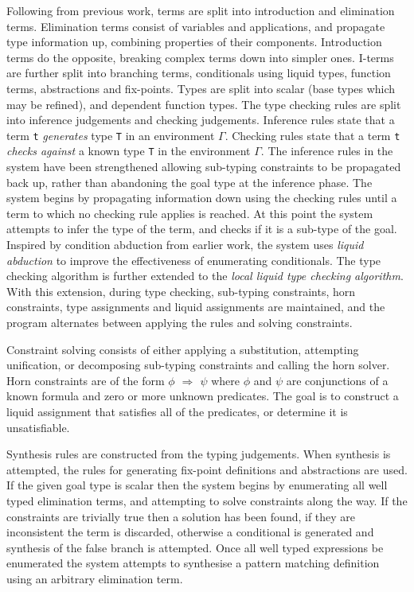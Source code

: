 \documentclass[a4paper]{article}
\begin{document}
Following from previous work, terms are split into introduction and elimination terms. Elimination terms consist of 
variables and applications, and propagate type information up, combining properties of their components. Introduction 
terms do the opposite, breaking complex terms down into simpler ones. I-terms are further split into branching terms, 
conditionals using liquid types, function terms, abstractions and fix-points. Types are split into scalar (base types which may be refined),
and dependent function types. The type checking rules are split into inference judgements and checking judgements. 
Inference rules state that a term \texttt{t} \emph{generates} type \texttt{T} in an environment \(\Gamma\). Checking rules state that a term 
\texttt{t} \emph{checks against} a known type \texttt{T} in the environment \(\Gamma\). The inference rules in the system have been strengthened
allowing sub-typing constraints to be propagated back up, rather than abandoning the goal type at the inference phase.
The system begins by propagating information down using the checking rules until a term to which no checking rule
applies is reached. At this point the system attempts to infer the type of the term, and checks if it is a sub-type of the goal.  
Inspired by condition abduction from earlier work, the system uses \emph{liquid abduction} to improve the effectiveness of 
enumerating conditionals. The type checking algorithm is further extended to the \emph{local liquid type checking algorithm}.
With this extension, during type checking, sub-typing constraints, horn constraints, type assignments and liquid assignments 
are maintained, and the program alternates between applying the rules and solving constraints. 

Constraint solving consists of either applying a substitution, attempting unification, or decomposing sub-typing constraints 
and calling the horn solver. Horn constraints are of the form \emph{\(\phi\) \(\Rightarrow\) \(\psi\)} where \(\phi\) and \(\psi\) are conjunctions of a 
known formula and zero or more unknown predicates. The goal is to construct a liquid assignment that satisfies all of the 
predicates, or determine it is unsatisfiable.  

Synthesis rules are constructed from the typing judgements. When synthesis is attempted, the rules for generating 
fix-point definitions and abstractions are used. If the given goal type is scalar then the system begins by enumerating 
all well typed elimination terms, and attempting to solve constraints along the way. If the constraints are trivially 
true then a solution has been found, if they are inconsistent the term is discarded, otherwise a conditional is generated 
and synthesis of the false branch is attempted. Once all well typed expressions be enumerated the system attempts
to synthesise a pattern matching definition using an arbitrary elimination term.
\end{document}
